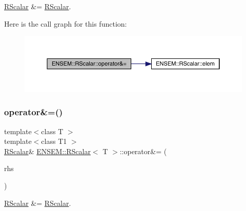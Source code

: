 \mbox{\hyperlink{classENSEM_1_1RScalar}{R\+Scalar}} \&= \mbox{\hyperlink{classENSEM_1_1RScalar}{R\+Scalar}}. 

Here is the call graph for this function\+:
\nopagebreak
\begin{figure}[H]
\begin{center}
\leavevmode
\includegraphics[width=350pt]{d0/d8c/classENSEM_1_1RScalar_aa091ededdea0fc13deb359321f213780_cgraph}
\end{center}
\end{figure}
\mbox{\label{classENSEM_1_1RScalar_aa091ededdea0fc13deb359321f213780}} 
\subsubsection{\texorpdfstring{operator\&=()}{operator\&=()}\hspace{0.1cm}{\footnotesize\ttfamily [2/2]}}
{\footnotesize\ttfamily template$<$class T $>$ \\
template$<$class T1 $>$ \\
\mbox{\hyperlink{classENSEM_1_1RScalar}{R\+Scalar}}\& \mbox{\hyperlink{classENSEM_1_1RScalar}{E\+N\+S\+E\+M\+::\+R\+Scalar}}$<$ T $>$\+::operator\&= (\begin{DoxyParamCaption}\item[{const \mbox{\hyperlink{classENSEM_1_1RScalar}{R\+Scalar}}$<$ T1 $>$ \&}]{rhs }\end{DoxyParamCaption})\hspace{0.3cm}{\ttfamily [inline]}}



\mbox{\hyperlink{classENSEM_1_1RScalar}{R\+Scalar}} \&= \mbox{\hyperlink{classENSEM_1_1RScalar}{R\+Scalar}}. 

